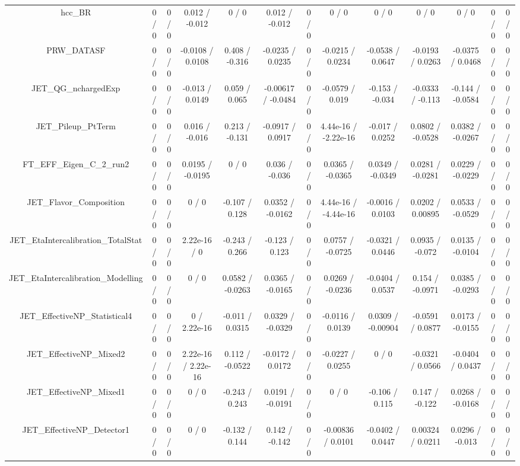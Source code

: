 \documentclass[10pt]{article}
\begin{document}
\begin{table}[htbp]
\begin{center}
\begin{tabular}{|c|c|c|c|c|c|c|c|c|c|c|c|c|}
  hcc_BR & 0 / 0 & 0 / 0 & 0.012 / -0.012 & 0 / 0 & 0.012 / -0.012 & 0 / 0 & 0 / 0 & 0 / 0 & 0 / 0 & 0 / 0 & 0 / 0 & 0 / 0 \\ 
  PRW_DATASF & 0 / 0 & 0 / 0 & -0.0108 / 0.0108 & 0.408 / -0.316 & -0.0235 / 0.0235 & 0 / 0 & -0.0215 / 0.0234 & -0.0538 / 0.0647 & -0.0193 / 0.0263 & -0.0375 / 0.0468 & 0 / 0 & 0 / 0 \\ 
  JET_QG_nchargedExp & 0 / 0 & 0 / 0 & -0.013 / 0.0149 & 0.059 / 0.065 & -0.00617 / -0.0484 & 0 / 0 & -0.0579 / 0.019 & -0.153 / -0.034 & -0.0333 / -0.113 & -0.144 / -0.0584 & 0 / 0 & 0 / 0 \\ 
  JET_Pileup_PtTerm & 0 / 0 & 0 / 0 & 0.016 / -0.016 & 0.213 / -0.131 & -0.0917 / 0.0917 & 0 / 0 & 4.44e-16 / -2.22e-16 & -0.017 / 0.0252 & 0.0802 / -0.0528 & 0.0382 / -0.0267 & 0 / 0 & 0 / 0 \\ 
  FT_EFF_Eigen_C_2_run2 & 0 / 0 & 0 / 0 & 0.0195 / -0.0195 & 0 / 0 & 0.036 / -0.036 & 0 / 0 & 0.0365 / -0.0365 & 0.0349 / -0.0349 & 0.0281 / -0.0281 & 0.0229 / -0.0229 & 0 / 0 & 0 / 0 \\ 
  JET_Flavor_Composition & 0 / 0 & 0 / 0 & 0 / 0 & -0.107 / 0.128 & 0.0352 / -0.0162 & 0 / 0 & 4.44e-16 / -4.44e-16 & -0.0016 / 0.0103 & 0.0202 / 0.00895 & 0.0533 / -0.0529 & 0 / 0 & 0 / 0 \\ 
  JET_EtaIntercalibration_TotalStat & 0 / 0 & 0 / 0 & 2.22e-16 / 0 & -0.243 / 0.266 & -0.123 / 0.123 & 0 / 0 & 0.0757 / -0.0725 & -0.0321 / 0.0446 & 0.0935 / -0.072 & 0.0135 / -0.0104 & 0 / 0 & 0 / 0 \\ 
  JET_EtaIntercalibration_Modelling & 0 / 0 & 0 / 0 & 0 / 0 & 0.0582 / -0.0263 & 0.0365 / -0.0165 & 0 / 0 & 0.0269 / -0.0236 & -0.0404 / 0.0537 & 0.154 / -0.0971 & 0.0385 / -0.0293 & 0 / 0 & 0 / 0 \\ 
  JET_EffectiveNP_Statistical4 & 0 / 0 & 0 / 0 & 0 / 2.22e-16 & -0.011 / 0.0315 & 0.0329 / -0.0329 & 0 / 0 & -0.0116 / 0.0139 & 0.0309 / -0.00904 & -0.0591 / 0.0877 & 0.0173 / -0.0155 & 0 / 0 & 0 / 0 \\ 
  JET_EffectiveNP_Mixed2 & 0 / 0 & 0 / 0 & 2.22e-16 / 2.22e-16 & 0.112 / -0.0522 & -0.0172 / 0.0172 & 0 / 0 & -0.0227 / 0.0255 & 0 / 0 & -0.0321 / 0.0566 & -0.0404 / 0.0437 & 0 / 0 & 0 / 0 \\ 
  JET_EffectiveNP_Mixed1 & 0 / 0 & 0 / 0 & 0 / 0 & -0.243 / 0.243 & 0.0191 / -0.0191 & 0 / 0 & 0 / 0 & -0.106 / 0.115 & 0.147 / -0.122 & 0.0268 / -0.0168 & 0 / 0 & 0 / 0 \\ 
  JET_EffectiveNP_Detector1 & 0 / 0 & 0 / 0 & 0 / 0 & -0.132 / 0.144 & 0.142 / -0.142 & 0 / 0 & -0.00836 / 0.0101 & -0.0402 / 0.0447 & 0.00324 / 0.0211 & 0.0296 / -0.013 & 0 / 0 & 0 / 0 \\ 

\end{tabular}
\end{center}
\end{table}
\end{document}
